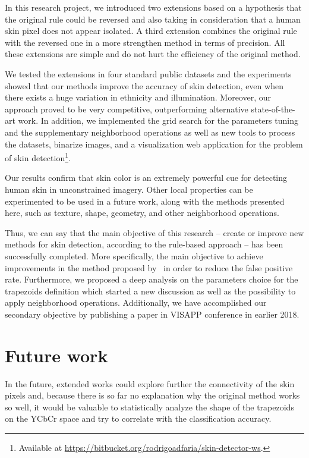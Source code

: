 In this research project, we introduced two extensions based on a hypothesis that the original rule could be reversed and also taking in consideration that a human skin pixel does not appear isolated. A third extension combines the original rule with the reversed one in a more strengthen method in terms of precision. All these extensions are simple and do not hurt the efficiency of the original method.

We tested the extensions in four standard public datasets and the experiments showed that our methods improve the accuracy of skin detection, even when there exists a huge variation in ethnicity and illumination. Moreover, our approach proved to be very competitive, outperforming alternative state-of-the-art work. In addition, we implemented the grid search for the parameters tuning and the supplementary neighborhood operations as well as new tools to process the datasets, binarize images, and a visualization web application for the problem of skin detection\footnote{Available at \url{https://bitbucket.org/rodrigoadfaria/skin-detector-ws}.}.

Our results confirm that skin color is an extremely powerful cue for detecting human skin in unconstrained imagery. Other local properties can be experimented to be used in a future work, along with the methods presented here, such as texture, shape, geometry, and other neighborhood operations.

Thus, we can say that the main objective of this research -- create or improve new methods for skin detection, according to the rule-based approach -- has been successfully completed. More specifically, the main objective to achieve improvements in the method proposed by~\citet{brancati:17} in order to reduce the false positive rate. Furthermore, we proposed a deep analysis on the parameters choice for the trapezoids definition which started a new discussion as well as the possibility to apply neighborhood operations. Additionally, we have accomplished our secondary objective by publishing a paper in VISAPP conference in earlier 2018.


\section{Future work}
\label{sec:future_work}

In the future, extended works could explore further the connectivity of the skin pixels and, because there is so far no explanation why the original method works so well, it would be valuable to statistically analyze the shape of the trapezoids on the YCbCr space and try to correlate with the classification accuracy.

